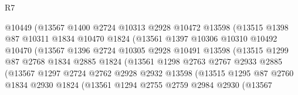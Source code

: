 \begin{lexlean}{R7}
\begin{coremodule}
                          @10449
                          (@13567
                            @1400
                            @2724
                            @10313
                            @2928
                            @10472
                            @13598
                            (@13515
                              @1398
                              @87
                              @10311
                              @1834
                              @10470
                              @1824
                              (@13561
                                @1397
                                @10306
                                @10310
                                @10492
                                @10470
                                (@13567
                                  @1396
                                  @2724
                                  @10305
                                  @2928
                                  @10491
                                  @13598
                                  (@13515
                                    @1299
                                    @87
                                    @2768
                                    @1834
                                    @2885
                                    @1824
                                    (@13561
                                      @1298
                                      @2763
                                      @2767
                                      @2933
                                      @2885
                                      (@13567
                                        @1297
                                        @2724
                                        @2762
                                        @2928
                                        @2932
                                        @13598
                                        (@13515
                                          @1295
                                          @87
                                          @2760
                                          @1834
                                          @2930
                                          @1824
                                          (@13561
                                            @1294
                                            @2755
                                            @2759
                                            @2984
                                            @2930
                                            (@13567

\end{coremodule}
\end{lexlean}
